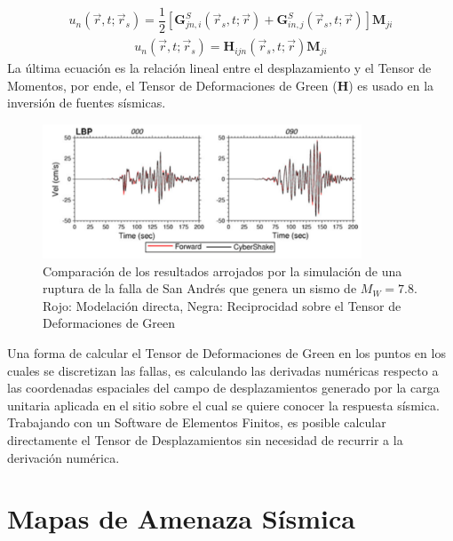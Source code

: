 \documentclass{beamer}
\begin{document}
\begin{frame}[allowframebreaks]
\begin{align*}
	u_n \left( \vec{r}, t; \vec{r}_s \right) = \dfrac{1}{2} \left[ \mathbf{G}_{jn,i}^S \left( \vec{r}_s, t; \vec{r} \right) + \mathbf{G}_{in,j}^S \left( \vec{r}_s, t; \vec{r} \right) \right] \mathbf{M}_{ji}
\end{align*}
\begin{align*}
	u_n \left( \vec{r}, t; \vec{r}_s \right) = \mathbf{H}_{ijn} \left( \vec{r}_s, t; \vec{r} \right) \mathbf{M}_{ji}
\end{align*}
%
\justifying
La última ecuación es la relación lineal entre el desplazamiento y el Tensor de Momentos, por ende, el Tensor de Deformaciones de Green ($\mathbf{H}$) es usado en la inversión de fuentes sísmicas. \cite{zhaogreen}
%
\begin{figure}[h]
	\centering
	\includegraphics[height=4cm]{img/Inversion.pdf}
	\caption{Comparación de los resultados arrojados por la simulación de una ruptura de la falla de San Andrés que genera un sismo de $M_W=7.8$. Rojo: Modelación directa, Negra: Reciprocidad sobre el Tensor de Deformaciones de Green \cite[figura 5, página 7]{gravesetal}}
	\vspace{-.5 cm}
\end{figure}
%
\justifying
Una forma de calcular el Tensor de Deformaciones de Green en los puntos en los cuales se discretizan las fallas, es calculando las derivadas numéricas respecto a las coordenadas espaciales del campo de desplazamientos generado por la carga unitaria aplicada en el sitio sobre el cual se quiere conocer la respuesta sísmica.\\
%
Trabajando con un Software de Elementos Finitos, es posible calcular directamente el Tensor de Desplazamientos sin necesidad de recurrir a la derivación numérica.
%
%
\end{frame}
%
%
\section{Mapas de Amenaza Sísmica}
\end{document}
